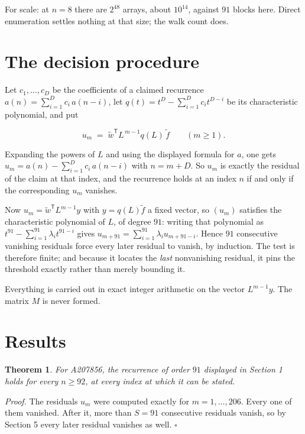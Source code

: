 \documentclass[11pt]{article}
\newtheorem{theorem}{Theorem}
\theoremstyle{definition}
\begin{document}
For scale: at $n = 8$ there are $2^{48}$ arrays, about $10^{14}$, against $91$ blocks here. Direct enumeration settles nothing at that size; the walk count does.

\section{The decision procedure}

Let $c_1,\dots,c_D$ be the coefficients of a claimed recurrence $a(n) = \sum_{i=1}^{D} c_i\,a(n-i)$, let $q(t) = t^{D} - \sum_{i=1}^{D} c_i t^{D-i}$ be its characteristic polynomial, and put

\[u_m \;=\; \tilde w^{\mathsf T} L^{\,m-1} q(L)\,\tilde f \qquad (m \ge 1).\]

Expanding the powers of $L$ and using the displayed formula for $a$, one gets $u_m = a(n) - \sum_{i=1}^{D} c_i\,a(n-i)$ with $n = m + D$. So $u_m$ is exactly the residual of the claim at that index, and the recurrence holds at an index $n$ if and only if the corresponding $u_m$ vanishes.

Now $u_m = \tilde w^{\mathsf T} L^{m-1} y$ with $y = q(L)\tilde f$ a fixed vector, so $(u_m)$ satisfies the characteristic polynomial of $L$, of degree $91$: writing that polynomial as $t^{91} - \sum_{i=1}^{91} \lambda_i t^{91-i}$ gives $u_{m+91} = \sum_{i=1}^{91} \lambda_i u_{m+91-i}$. Hence $91$ consecutive vanishing residuals force every later residual to vanish, by induction. The test is therefore finite; and because it locates the {\itshape last} nonvanishing residual, it pins the threshold exactly rather than merely bounding it.

Everything is carried out in exact integer arithmetic on the vector $L^{m-1}y$. The matrix $M$ is never formed.

\section{Results}

\begin{theorem} For A207856, the recurrence of order $91$ displayed in Section 1 holds for every $n \ge 92$, at every index at which it can be stated.\end{theorem}

{\itshape Proof.} The residuals $u_m$ were computed exactly for $m = 1,\dots,206$. Every one of them vanished. After it, more than $S = 91$ consecutive residuals vanish, so by Section 5 every later residual vanishes as well. $\square$
\end{document}
